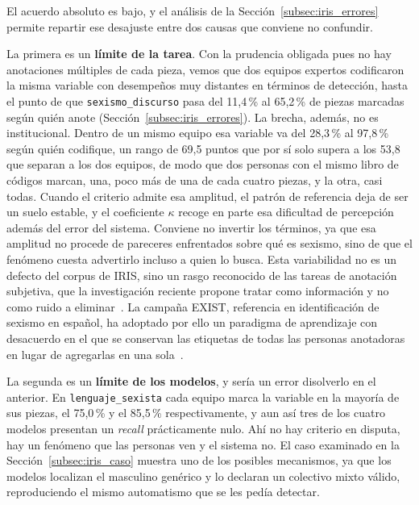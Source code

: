 El acuerdo absoluto es bajo, y el análisis de la Sección~\ref{subsec:iris_errores} permite repartir ese
desajuste entre dos causas que conviene no confundir.

La primera es un \textbf{límite de la tarea}. Con la prudencia obligada pues no hay anotaciones múltiples de cada pieza, vemos que dos equipos expertos codificaron la
misma variable con desempeños muy distantes en términos de detección, hasta el punto de que
\texttt{sexismo\_discurso} pasa del 11,4\,\% al 65,2\,\% de piezas marcadas según
quién anote (Sección~\ref{subsec:iris_errores}). La brecha, además, no es
institucional. Dentro de un mismo equipo esa variable va del 28,3\,\% al 97,8\,\%
según quién codifique, un rango de 69,5 puntos que por sí solo supera a los 53,8 que
separan a los dos equipos, de modo que dos personas con el mismo
libro de códigos marcan, una, poco más de una de cada cuatro piezas, y la otra, casi
todas. Cuando el criterio admite esa
amplitud, el patrón de referencia deja de ser un suelo estable, y el coeficiente
$\kappa$ recoge en parte esa dificultad de percepción además del error del sistema.
Conviene no invertir los términos, ya que esa amplitud no procede de pareceres
enfrentados sobre qué es sexismo, sino de que el fenómeno cuesta advertirlo incluso a
quien lo busca.
Esta variabilidad no es un defecto del corpus de IRIS, sino un rasgo reconocido de
las tareas de anotación subjetiva, que la investigación reciente propone tratar
como información y no como ruido a eliminar~\cite{davani2022, plank2022}. La
campaña EXIST, referencia en identificación de sexismo en español, ha adoptado por
ello un paradigma de aprendizaje con desacuerdo en el que se conservan las
etiquetas de todas las personas anotadoras en lugar de agregarlas en una
sola~\cite{plaza2024}.

La segunda es un \textbf{límite de los modelos}, y sería un error disolverlo en el
anterior. En \texttt{lenguaje\_sexista} cada equipo marca la variable en la mayoría de
sus piezas, el 75,0\,\% y el 85,5\,\% respectivamente, y
aun así tres de los cuatro modelos presentan un \textit{recall} prácticamente nulo. Ahí no
hay criterio en disputa, hay un fenómeno que las personas ven y el sistema no. El
caso examinado en la Sección~\ref{subsec:iris_caso} muestra uno de los posibles mecanismos, ya que
los modelos localizan el masculino genérico y lo declaran un colectivo mixto
válido, reproduciendo el mismo automatismo que se les pedía detectar.

